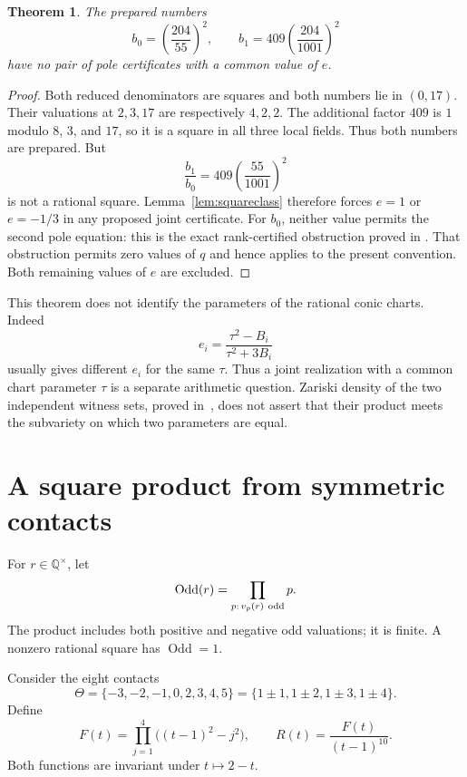\documentclass[11pt,a4paper]{article}
\newtheorem{theorem}{Theorem}[section]
\newcommand{\Q}{\mathbb Q}
\begin{document}
\begin{theorem}\label{thm:shared-e}
The prepared numbers
\[
 b_0=\left(\frac{204}{55}\right)^2,\qquad
 b_1=409\left(\frac{204}{1001}\right)^2
\]
have no pair of pole certificates with a common value of $e$.
\end{theorem}
\begin{proof}
Both reduced denominators are squares and both numbers lie in $(0,17)$.
Their valuations at $2,3,17$ are respectively $4,2,2$.
The additional factor $409$ is $1$ modulo $8$, $3$, and $17$,
so it is a square in all three local fields. Thus both numbers
are prepared. But
\[
                  \frac{b_1}{b_0}
                   =409\left(\frac{55}{1001}\right)^2
\]
is not a rational square. Lemma~\ref{lem:squareclass} therefore
forces $e=1$ or $e=-1/3$ in any proposed joint certificate.
For $b_0$, neither value permits the second pole equation:
this is the exact rank-certified obstruction proved in
\cite[Theorem~1.2 and Sections~2--3]{Fixed}.
That obstruction permits zero values of $q$ and hence applies
to the present convention. Both remaining values of $e$ are excluded.
\end{proof}

This theorem does not identify the parameters of the rational conic
charts. Indeed
\[
 e_i=\frac{\tau^2-B_i}{\tau^2+3B_i}
\]
usually gives different $e_i$ for the same $\tau$.
Thus a joint realization with a common chart parameter $\tau$
is a separate arithmetic question. Zariski density of the two
independent witness sets, proved in~\cite{Density}, does not
assert that their product meets the subvariety on which two
parameters are equal.

\section{A square product from symmetric contacts}

For $r\in\Q^\times$, let
\[
 \operatorname{Odd}(r)=\prod_{p:\,v_p(r)\ {\rm odd}}p.
\]
The product includes both positive and negative odd valuations;
it is finite. A nonzero rational square has $\operatorname{Odd}=1$.

Consider the eight contacts
\[
 \Theta=\{-3,-2,-1,0,2,3,4,5\}
        =\{1\pm1,1\pm2,1\pm3,1\pm4\}.
\]
Define
\[
 F(t)=\prod_{j=1}^4\bigl((t-1)^2-j^2\bigr),\qquad
 R(t)=\frac{F(t)}{(t-1)^{10}}.
\]
Both functions are invariant under $t\mapsto2-t$.
\end{document}
